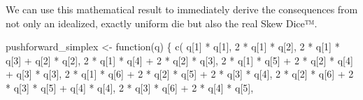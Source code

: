 \documentclass[
  letterpaper,
  DIV=11,
  numbers=noendperiod]{scrartcl}
\newenvironment{Shaded}{\begin{snugshade}}{\end{snugshade}}
\newcommand{\ControlFlowTok}[1]{\textcolor[rgb]{0.00,0.23,0.31}{#1}}
\newcommand{\DecValTok}[1]{\textcolor[rgb]{0.68,0.00,0.00}{#1}}
\newcommand{\FunctionTok}[1]{\textcolor[rgb]{0.28,0.35,0.67}{#1}}
\newcommand{\NormalTok}[1]{\textcolor[rgb]{0.00,0.23,0.31}{#1}}
\newcommand{\OtherTok}[1]{\textcolor[rgb]{0.00,0.23,0.31}{#1}}
\newcommand{\SpecialCharTok}[1]{\textcolor[rgb]{0.37,0.37,0.37}{#1}}
\begin{document}
We can use this mathematical result to immediately derive the
consequences from not only an idealized, exactly uniform die but also
the real Skew Dice™.

\begin{Shaded}
\begin{Highlighting}[]
\NormalTok{pushforward\_simplex }\OtherTok{\textless{}{-}} \ControlFlowTok{function}\NormalTok{(q) \{}
  \FunctionTok{c}\NormalTok{(    q[}\DecValTok{1}\NormalTok{] }\SpecialCharTok{*}\NormalTok{ q[}\DecValTok{1}\NormalTok{],}
    \DecValTok{2} \SpecialCharTok{*}\NormalTok{ q[}\DecValTok{1}\NormalTok{] }\SpecialCharTok{*}\NormalTok{ q[}\DecValTok{2}\NormalTok{],}
    \DecValTok{2} \SpecialCharTok{*}\NormalTok{ q[}\DecValTok{1}\NormalTok{] }\SpecialCharTok{*}\NormalTok{ q[}\DecValTok{3}\NormalTok{] }\SpecialCharTok{+}\NormalTok{     q[}\DecValTok{2}\NormalTok{] }\SpecialCharTok{*}\NormalTok{ q[}\DecValTok{2}\NormalTok{],}
    \DecValTok{2} \SpecialCharTok{*}\NormalTok{ q[}\DecValTok{1}\NormalTok{] }\SpecialCharTok{*}\NormalTok{ q[}\DecValTok{4}\NormalTok{] }\SpecialCharTok{+} \DecValTok{2} \SpecialCharTok{*}\NormalTok{ q[}\DecValTok{2}\NormalTok{] }\SpecialCharTok{*}\NormalTok{ q[}\DecValTok{3}\NormalTok{],}
    \DecValTok{2} \SpecialCharTok{*}\NormalTok{ q[}\DecValTok{1}\NormalTok{] }\SpecialCharTok{*}\NormalTok{ q[}\DecValTok{5}\NormalTok{] }\SpecialCharTok{+} \DecValTok{2} \SpecialCharTok{*}\NormalTok{ q[}\DecValTok{2}\NormalTok{] }\SpecialCharTok{*}\NormalTok{ q[}\DecValTok{4}\NormalTok{] }\SpecialCharTok{+}\NormalTok{     q[}\DecValTok{3}\NormalTok{] }\SpecialCharTok{*}\NormalTok{ q[}\DecValTok{3}\NormalTok{],}
    \DecValTok{2} \SpecialCharTok{*}\NormalTok{ q[}\DecValTok{1}\NormalTok{] }\SpecialCharTok{*}\NormalTok{ q[}\DecValTok{6}\NormalTok{] }\SpecialCharTok{+} \DecValTok{2} \SpecialCharTok{*}\NormalTok{ q[}\DecValTok{2}\NormalTok{] }\SpecialCharTok{*}\NormalTok{ q[}\DecValTok{5}\NormalTok{] }\SpecialCharTok{+} \DecValTok{2} \SpecialCharTok{*}\NormalTok{ q[}\DecValTok{3}\NormalTok{] }\SpecialCharTok{*}\NormalTok{ q[}\DecValTok{4}\NormalTok{],}
    \DecValTok{2} \SpecialCharTok{*}\NormalTok{ q[}\DecValTok{2}\NormalTok{] }\SpecialCharTok{*}\NormalTok{ q[}\DecValTok{6}\NormalTok{] }\SpecialCharTok{+} \DecValTok{2} \SpecialCharTok{*}\NormalTok{ q[}\DecValTok{3}\NormalTok{] }\SpecialCharTok{*}\NormalTok{ q[}\DecValTok{5}\NormalTok{] }\SpecialCharTok{+}\NormalTok{     q[}\DecValTok{4}\NormalTok{] }\SpecialCharTok{*}\NormalTok{ q[}\DecValTok{4}\NormalTok{],}
    \DecValTok{2} \SpecialCharTok{*}\NormalTok{ q[}\DecValTok{3}\NormalTok{] }\SpecialCharTok{*}\NormalTok{ q[}\DecValTok{6}\NormalTok{] }\SpecialCharTok{+} \DecValTok{2} \SpecialCharTok{*}\NormalTok{ q[}\DecValTok{4}\NormalTok{] }\SpecialCharTok{*}\NormalTok{ q[}\DecValTok{5}\NormalTok{],}

\end{Highlighting}
\end{Shaded}
\end{document}
